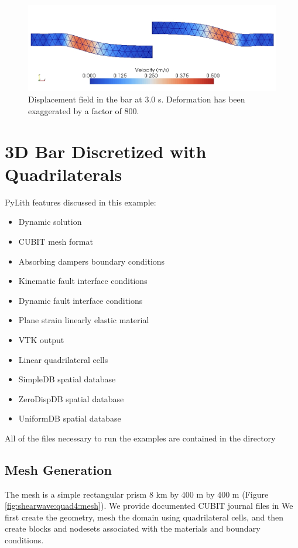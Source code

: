 \begin{figure}
  \includegraphics[scale=0.5]{examples/figs/shearwave_tri3deform30}
  \caption{Displacement field in the bar at 3.0 s. Deformation has been exaggerated
    by a factor of 800.}
  \label{fig:shearwave:tri3:deform}
\end{figure}


\section{3D Bar Discretized with Quadrilaterals}
\label{sec:example:shearwave:quad4}

PyLith features discussed in this example:
\begin{itemize}
\item Dynamic solution
\item CUBIT mesh format
\item Absorbing dampers boundary conditions
\item Kinematic fault interface conditions
\item Dynamic fault interface conditions
\item Plane strain linearly elastic material
\item VTK output
\item Linear quadrilateral cells
\item SimpleDB spatial database
\item ZeroDispDB spatial database
\item UniformDB spatial database
\end{itemize}
All of the files necessary to run the examples are contained in the
directory 


\subsection{Mesh Generation}

The mesh is a simple rectangular prism 8 km by 400 m by 400 m (Figure
\vref{fig:shearwave:quad4:mesh}). We provide documented CUBIT journal
files in  We first create the
geometry, mesh the domain using quadrilateral cells, and then create
blocks and nodesets associated with the materials and boundary conditions.

